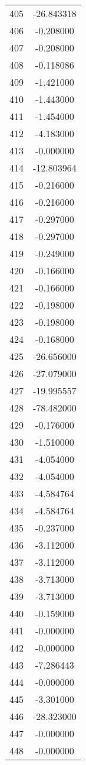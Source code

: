 \documentclass[12pt]{article}
\begin{document}
\begin{longtable}{@{}cc@{}}
405 & -26.843318 \\
406 & -0.208000 \\
407 & -0.208000 \\
408 & -0.118086 \\
409 & -1.421000 \\
410 & -1.443000 \\
411 & -1.454000 \\
412 & -4.183000 \\
413 & -0.000000 \\
414 & -12.803964 \\
415 & -0.216000 \\
416 & -0.216000 \\
417 & -0.297000 \\
418 & -0.297000 \\
419 & -0.249000 \\
420 & -0.166000 \\
421 & -0.166000 \\
422 & -0.198000 \\
423 & -0.198000 \\
424 & -0.168000 \\
425 & -26.656000 \\
426 & -27.079000 \\
427 & -19.995557 \\
428 & -78.482000 \\
429 & -0.176000 \\
430 & -1.510000 \\
431 & -4.054000 \\
432 & -4.054000 \\
433 & -4.584764 \\
434 & -4.584764 \\
435 & -0.237000 \\
436 & -3.112000 \\
437 & -3.112000 \\
438 & -3.713000 \\
439 & -3.713000 \\
440 & -0.159000 \\
441 & -0.000000 \\
442 & -0.000000 \\
443 & -7.286443 \\
444 & -0.000000 \\
445 & -3.301000 \\
446 & -28.323000 \\
447 & -0.000000 \\
448 & -0.000000 \\

\end{longtable}
\end{document}
